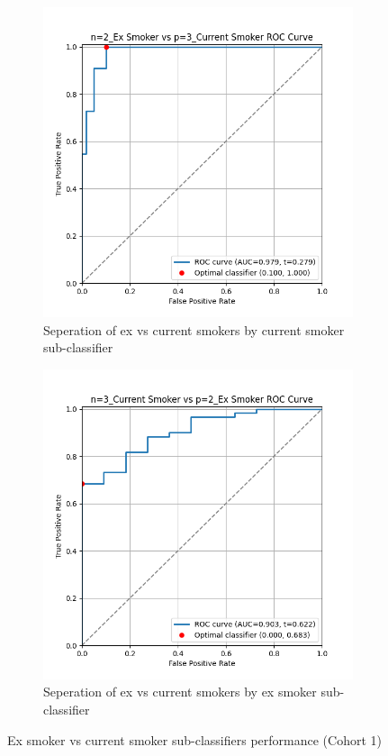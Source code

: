 \documentclass{article}
\begin{document}
\begin{figure}
    \begin{subfigure}{0.48\textwidth}
        \centering
        \includegraphics[width=\linewidth]{cohort1_2v3_roc.png}
        \caption{Seperation of ex vs current smokers by current smoker sub-classifier}
    \end{subfigure}
    \hfill
    \begin{subfigure}{0.48\textwidth}
        \centering
        \includegraphics[width=\linewidth]{cohort1_3v2_roc.png}
        \caption{Seperation of ex vs current smokers by ex smoker sub-classifier}
    \end{subfigure}
    \caption{Ex smoker vs current smoker sub-classifiers performance (Cohort 1)}
\end{figure}
\end{document}
